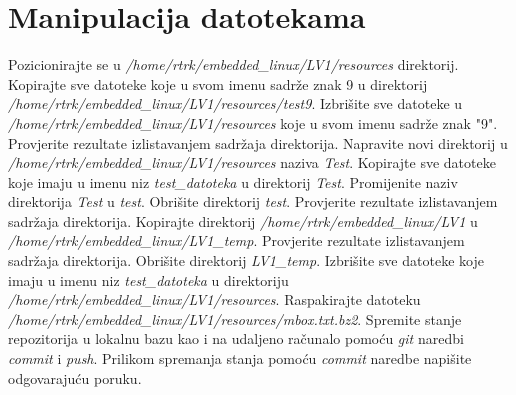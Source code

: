 \documentclass[11pt]{article}
\begin{document}
 \section{Manipulacija datotekama}
 Pozicionirajte se u \textit{/home/rtrk/embedded\_linux/LV1/resources}
 direktorij. Kopirajte sve datoteke koje u svom imenu sadrže znak 9 u
 direktorij \\ \textit{/home/rtrk/embedded\_linux/LV1/resources/test9}.
 Izbrišite sve datoteke u \textit{/home/rtrk/embedded\_linux/LV1/resources}
 koje u svom imenu sadrže znak "9". Provjerite rezultate izlistavanjem sadržaja
 direktorija.
\newline
\newline
Napravite novi direktorij u \textit{/home/rtrk/embedded\_linux/LV1/resources}
 naziva \textit{Test}. Kopirajte sve datoteke koje imaju u imenu niz
 \textit{test\_datoteka} u direktorij \textit{Test}. Promijenite naziv
 direktorija \textit{Test} u \textit{test}. Obrišite direktorij \textit{test}.
 Provjerite rezultate izlistavanjem sadržaja direktorija.
 \newline
 \newline
Kopirajte direktorij \textit{/home/rtrk/embedded\_linux/LV1} u \\
 \textit{/home/rtrk/embedded\_linux/LV1\_temp}. Provjerite rezultate
 izlistavanjem sadržaja direktorija. Obrišite direktorij \textit{LV1\_temp}.
\newline
\newline
Izbrišite sve datoteke koje imaju u imenu niz \textit{test\_datoteka} u
 direktoriju \textit{/home/rtrk/embedded\_linux/LV1/resources}.
\newline
\newline
Raspakirajte datoteku
 \textit{/home/rtrk/embedded\_linux/LV1/resources/mbox.txt.bz2}. Spremite
 stanje repozitorija u lokalnu bazu kao i na udaljeno računalo pomoću
 \textit{git} naredbi \textit{commit} i \textit{push}. Prilikom spremanja
 stanja pomoću \textit{commit} naredbe napišite odgovarajuću poruku.
\end{document}
